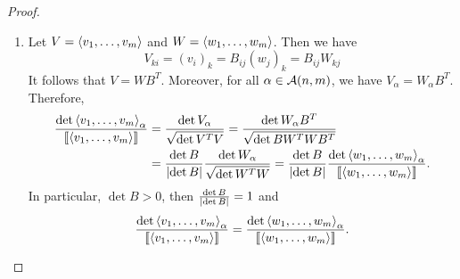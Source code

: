 \documentclass[a4paper]{article}
\begin{document}
\begin{proof}
  \begin{enumerate}
    \item Let $V = \left\langle v_1, \dots, v_m \right\rangle$ and $W = \left\langle w_1, \dots,
          w_m \right\rangle$. Then we have
          \[
            V_{ki} = (v_i)_k = B_{ij} (w_j)_k = B_{ij} W_{kj}
          \]
          It follows that $V = W B^T$. Moreover, for all $\alpha \in
          \mathcal{A}(n, m)$, we have $V_\alpha = W_\alpha B^T$. Therefore,
          \[
            \begin{aligned}
              \frac{\det \left\langle v_1, \dots, v_m \right\rangle_\alpha}{\left\llbracket \left\langle v_1,
                    \dots, v_m \right\rangle \right\rrbracket}
               & = \frac{\det V_\alpha}{\sqrt{\det V^T V}}
              = \frac{\det W_\alpha B^T}{\sqrt{\det B W^T W B^T}}        \\
               & = \frac{\det B}{\left\lvert \det B\right\rvert} \frac{\det W_\alpha}{\sqrt
                                                 {\det W^T W}}
              = \frac{\det B}{\left\lvert \det B\right\rvert} \frac{\det \left\langle w_1, \dots,
                                                w_m \right\rangle_\alpha}{\left\llbracket \left\langle w_1, \dots, w_m \right\rangle \right\rrbracket}.
            \end{aligned}
          \]
          In particular, $\det B > 0$, then $\frac{\det B}{\left\lvert \det B\right\rvert} =
          1$ and
          \[
            \frac{\det \left\langle v_1, \dots, v_m \right\rangle_\alpha}{\left\llbracket \left\langle v_1,
                  \dots, v_m \right\rangle \right\rrbracket}
            = \frac{\det \left\langle w_1, \dots,
                w_m \right\rangle_\alpha}{\left\llbracket \left\langle w_1, \dots, w_m \right\rangle \right\rrbracket}.
          \]


\end{enumerate}
\end{proof}
\end{document}
